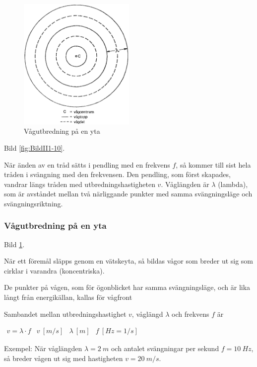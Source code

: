 \begin{figure}
  \includegraphics[width=0.5\textwidth]{images/cropped_pdfs/bild_2_1-11.pdf}
  \caption{Vågutbredning på en yta}
  \label{fig:BildII1-11}
\end{figure}

Bild \ref{fig:BildII1-10}.

När änden av en tråd sätts i pendling med en frekvens \(f\), så kommer till
sist hela tråden i svängning med den frekvensen. Den pendling, som först
skapades, vandrar längs tråden med utbredningshastigheten \(v\). Våglängden är
\(\lambda\) (lambda), som är avståndet mellan två närliggande punkter med samma
svängningsläge och svängningsriktning.

\subsubsection{Vågutbredning på en yta}

Bild \ref{fig:BildII1-11}.

När ett föremål släpps genom en vätskeyta, så bildas vågor som breder ut sig
som cirklar i varandra (koncentriska).

De punkter på vågen, som för ögonblicket har samma svängningsläge, och är lika
långt från energikällan, kallas för vågfront

Sambandet mellan utbredningshastighet \(v\), våglängd \(\lambda\) och frekvens
\(f\) är

\(
\begin{array}{llll}
v = \lambda \cdot f & v \ [m/s] & \lambda \ [m] & f \ [Hz=1/s]
\end{array}
\)

Exempel: När våglängden \(\lambda = 2\ m\) och antalet svängningar per sekund
\(f = 10\ Hz\), så breder vågen ut sig med hastigheten \(v = 20\ m/s\).

